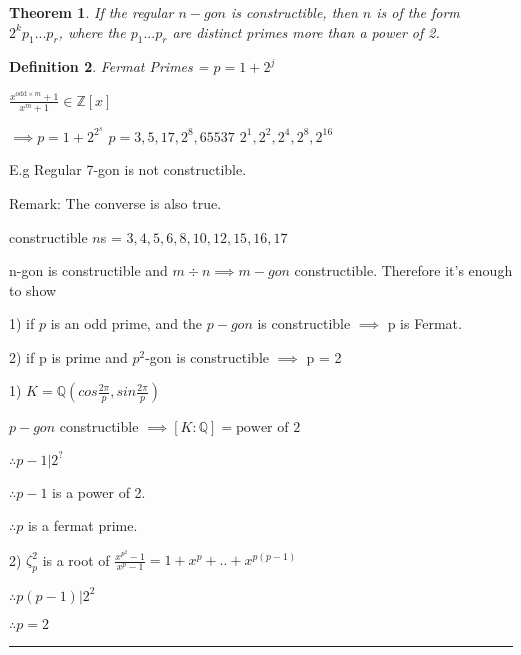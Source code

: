 \documentclass[twoside]{article}
\newcounter{lecnum}
\newcommand{\Z}{\mathbb{Z}}
\newcommand{\Q}{\mathbb{Q}}
\newtheorem{theorem}{Theorem}[lecnum]
\newtheorem{definition}[theorem]{Definition}
\newenvironment{proof}{{\bf Proof:}}{\hfill\rule{2mm}{2mm}}
\newcommand\R{\mathbb{R}}
\begin{document}
    \begin{theorem}
        If the regular $n-gon$ is constructible, then $n$ is of the form $2^kp_1...p_r$, where the $p_1...p_r$ are distinct primes more than a power of 2.
    \end{theorem}

    \begin{definition}
        Fermat Primes = $p = 1 + 2^j$

        $\frac{x^{\text{odd}\times m} + 1}{x^m + 1} \in \Z[x]$
        
        $\implies p = 1 + 2^{2^s}$
        $p = 3,5,17,2^8, 65537$
        $2^1, 2^2, 2^4, 2^8, 2^{16}$
    \end{definition}

    E.g Regular 7-gon is not constructible.

    Remark: The converse is also true. 

    constructible $n$s = $3,4,5,6,8,10,12,15,16,17$

    \begin{proof}
        n-gon is constructible and  $m \div n \implies m-gon$ constructible. Therefore it's enough to show 

        1) if $p$ is an odd prime, and the $p-gon$ is constructible $\implies$ p is Fermat.

        2) if p is prime and $p^2$-gon is constructible $\implies$ p = 2

        1) $K = \Q (cos \frac{2\pi}{p}, sin \frac{2\pi}{p})$

        $p-gon$ constructible $\implies [K : \Q] = \text{power of 2}$


        $\therefore p-1 \vert 2^{?}$

        $\therefore p-1 $ is a power of 2. 

        $\therefore p$ is a fermat prime.

        2) $\zeta_p^2 $ is a root of $\frac{x^{p^2} - 1}{x^p - 1} = 1 + x^p + .. + x^{p(p-1)}$

    
        $\therefore p(p-1) \vert 2^2$

        $\therefore p = 2$
    \end{proof}
\end{document}
